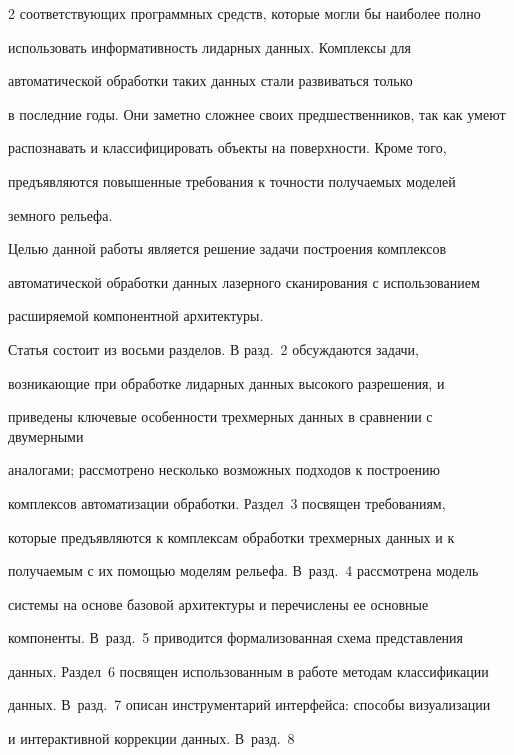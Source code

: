 \begin{multicols}{2}
соответствующих программных средств, которые могли бы наиболее полно 

использовать информативность лидарных данных. Комплексы для 

автоматической обработки таких данных стали развиваться только\linebreak\vspace*{-12pt}

\pagebreak



\noindent

 в последние годы. Они заметно сложнее своих предшественников, так как умеют 

распознавать и классифицировать объекты на поверхности. Кроме того, 

предъявляются повышенные требования к точ\-ности получаемых моделей 

земного рельефа. 

   

   Целью данной работы является решение задачи построения комплексов 

автоматической обработки данных лазерного сканирования с использованием 

расширяемой компонентной архитектуры.

   

   Статья состоит из восьми разделов. В разд.~2 обсуждаются задачи, 

возникающие при обработке лидарных данных высокого разрешения, и 

приведены ключевые особенности трехмерных данных в сравнении с двумерными 

аналогами; рассмотрено несколько возможных подходов к построению 

комплексов автоматизации обработки. Раздел~3 посвящен требованиям, 

которые предъявляются к комплексам обработки трехмерных данных и к 

получаемым с их помощью моделям рельефа. В~разд.~4 рас\-смот\-ре\-на модель 

системы на основе базовой архитектуры и перечислены ее основные 

компоненты. В~разд.~5 приводится формализованная схема представления 

данных. Раздел~6 посвящен использованным в работе методам классификации 

данных. В~разд.~7 описан инструментарий интерфейса: способы визуализации 

и интерактивной коррекции данных. В~разд.~8 


\end{multicols}
